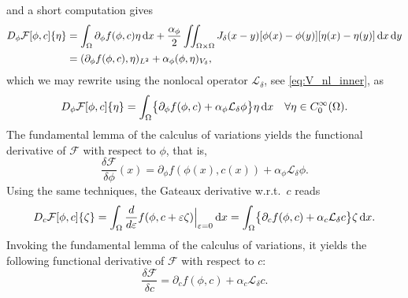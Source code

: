 \documentclass[]{article}
\newcommand{\eps}{\varepsilon}
\newcommand{\dx}{\,\textup{d}x}
\newcommand{\dy}{\,\textup{d}y}
\begin{document}
and a short computation gives
\[
\begin{aligned} D_{\phi}\mathcal{F}[\phi,c]\{\eta\}
	&=\int_{\Omega}\partial_\phi f(\phi,c)\eta \dx
	+\frac{\alpha_{\phi}}{2}
	\iint_{\Omega\times\Omega}J_{\delta}(x-y)[\phi(x)-\phi(y)][\eta(x)-\eta(y)]\dx\dy \\
	&=(\partial_\phi f(\phi,c),\eta)_{L^2}
	+\alpha_{\phi} (\phi,\eta)_{V_\delta},
\end{aligned}
\]
which we may rewrite using the nonlocal operator $\mathcal{L}_\delta$, see \eqref{eq:V_nl_inner}, as 
\[
D_{\phi}\mathcal{F}[\phi,c]\{\eta\}
=\int_{\Omega}\bigl\{\partial_\phi f(\phi,c)
+\alpha_{\phi} \mathcal{L}_\delta \phi \bigr\} \eta\dx \quad \forall \eta \in C_0^\infty(\Omega).
\]
The fundamental lemma of the calculus of variations yields the functional derivative of $\mathcal{F}$ with respect to $\phi$, that is,
\begin{equation}
	\label{Eq:FuncDerivPhi}
	\dfrac{\delta\mathcal{F}}{\delta\phi}(x)
	=\partial_\phi f(\phi(x),c(x))
	+\alpha_{\phi}\mathcal{L}_\delta \phi.
\end{equation}
Using the same techniques, the Gateaux derivative w.r.t.\ \(c\) reads
\[
D_{c}\mathcal{F}[\phi,c]\{\zeta\}
=\int_{\Omega}\frac{d}{d\eps} f(\phi,c+\eps\zeta)\Big|_{\eps=0}\dx = \int_{\Omega} \bigl\{ \partial_c f(\phi,c) + \alpha_c \mathcal{L}_\delta c\bigr\} \zeta \dx.
\]
Invoking the fundamental lemma of the calculus of variations, it yields the following functional derivative of $\mathcal{F}$ with respect to $c$:
\begin{equation}
	\label{Eq:FuncDerivC}
	\dfrac{\delta\mathcal{F}}{\delta c}
	=\partial_c f(\phi,c) + \alpha_c \mathcal{L}_\delta c.
\end{equation}
\end{document}
